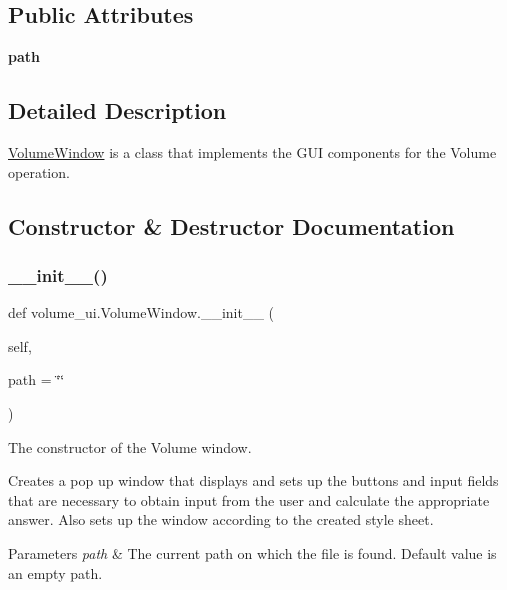 \subsection*{Public Attributes}
\begin{DoxyCompactItemize}
\item 
\mbox{\label{classvolume__ui_1_1_volume_window_ac1968ad0245de90cc4efb39c682d77b1}} 
{\bfseries path}
\end{DoxyCompactItemize}


\subsection{Detailed Description}
\hyperlink{classvolume__ui_1_1_volume_window}{Volume\+Window} is a class that implements the G\+UI components for the Volume operation. 

\subsection{Constructor \& Destructor Documentation}
\mbox{\label{classvolume__ui_1_1_volume_window_ab2ab926742b93b5fc0030332e60d4bc7}} 
\subsubsection{\texorpdfstring{\+\_\+\+\_\+init\+\_\+\+\_\+()}{\_\_init\_\_()}}
{\footnotesize\ttfamily def volume\+\_\+ui.\+Volume\+Window.\+\_\+\+\_\+init\+\_\+\+\_\+ (\begin{DoxyParamCaption}\item[{}]{self,  }\item[{}]{path = {\ttfamily \char`\"{}\char`\"{}} }\end{DoxyParamCaption})}



The constructor of the Volume window. 

Creates a pop up window that displays and sets up the buttons and input fields that are necessary to obtain input from the user and calculate the appropriate answer. Also sets up the window according to the created style sheet. 
\begin{DoxyParams}{Parameters}
{\em path} & The current path on which the file is found. Default value is an empty path. \\
\hline
\end{DoxyParams}


